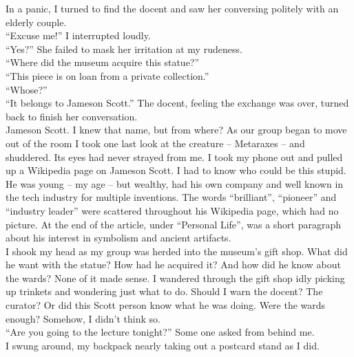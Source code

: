 \documentclass[a5paper]{scrartcl}
\begin{document}
In a panic, I turned to find the docent and saw her conversing politely with an elderly couple. \\


\enquote{Excuse me!} I interrupted loudly. \\


\enquote{Yes?} She failed to mask her irritation at my rudeness.\\


\enquote{Where did the museum acquire this statue?}\\


\enquote{This piece is on loan from a private collection.}\\


\enquote{Whose?}\\


\enquote{It belongs to Jameson Scott.} The docent, feeling the exchange was over, turned back to finish her conversation. \\


Jameson Scott. I knew that name, but from where? As our group began to move out of the room I took one last look at the creature -- Metaraxes -- and shuddered. Its eyes had never strayed from me. I took my phone out and pulled up a Wikipedia page on Jameson Scott. I had to know who could be this stupid.\\


He was young -- my age -- but wealthy, had his own company and well known in the tech industry for multiple inventions. The words \enquote{brilliant}, \enquote{pioneer} and \enquote{industry leader} were scattered throughout his Wikipedia page, which had no picture. At the end of the article, under \enquote{Personal Life}, was a short paragraph about his interest in symbolism and ancient artifacts.\\


I shook my head as my group was herded into the museum's gift shop. What did he want with the statue? How had he acquired it? And how did he know about the wards? None of it made sense. I wandered through the gift shop idly picking up trinkets and wondering just what to do. Should I warn the docent? The curator? Or did this Scott person know what he was doing.  Were the wards enough? Somehow, I didn't think so.\\


\enquote{Are you going to the lecture tonight?} Some one asked from behind me.\\


I swung around, my backpack nearly taking out a postcard stand as I did.\\
\end{document}
